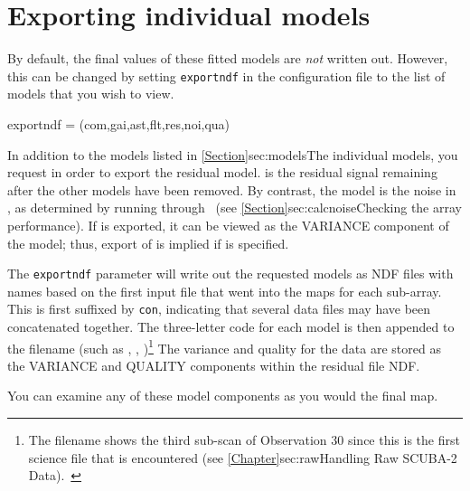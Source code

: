 \documentclass[11pt,oneside,chapters]{starlink}
\begin{document}
\section{Exporting individual models}
\label{sec:export}

By default, the final values of these fitted models are \emph{not}
written out. However, this can be changed by setting
\texttt{exportndf} in the configuration file to the list of models
that you wish to view.

\begin{terminalv}
exportndf = (com,gai,ast,flt,res,noi,qua)
\end{terminalv}

In addition to the models listed in \cref{Section}{sec:models}{The
individual models}, you request  in order to export the
residual model.  is the residual signal remaining after
the other models have been removed. By contrast, the 
model is the noise in , as determined by running
 through \calcnoise\ (see
\cref{Section}{sec:calcnoise}{Checking the array performance}). If
 is exported, it can be viewed as the VARIANCE component
of the  model; thus, export of  is implied if
 is specified.


The \texttt{exportndf} parameter will write out the requested models
as NDF files with names based on the first input file that went into
the maps for each sub-array. This is first suffixed by \texttt{con},
indicating that several data files may have been concatenated
together. The three-letter code for each model is then appended to the
filename (such as ,
,
)\footnote{The filename
shows the third sub-scan of Observation 30 since this is the first science
file that is encountered (see \cref{Chapter}{sec:raw}{Handling Raw
SCUBA-2 Data}).~} The variance and quality for the data are stored as
the VARIANCE and QUALITY components within the residual file NDF.

\begin{tip}
You can examine any of these model components as you would the final map.
\end{tip}
\end{document}
